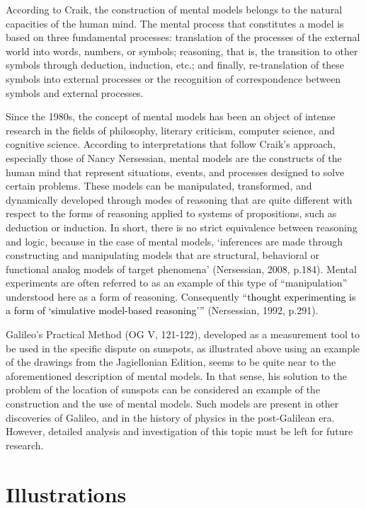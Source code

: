 \begin{artengenv}
According to Craik, the construction of mental models belongs to the natural capacities of the human mind. The mental
process that constitutes a model is based on three fundamental processes: translation of the processes of the external
world into words, numbers, or symbols; reasoning, that is, the transition to other symbols through deduction,
induction, etc.; and finally, re-translation of these symbols into external processes or the recognition of
correspondence between symbols and external processes.

Since the 1980s, the concept of mental models has been an object of intense research in the fields of philosophy,
literary criticism, computer science, and cognitive science. According to interpretations that follow Craik’s approach,
especially those of Nancy Nersessian, mental models are the constructs of the human mind that represent situations,
events, and processes designed to solve certain problems. These models can be manipulated, transformed, and dynamically
developed through modes of reasoning that are quite different with respect to the forms of reasoning applied to systems
of propositions, such as deduction or induction. In short, there is no strict equivalence between reasoning and logic,
because in the case of mental models, ‘inferences are made through constructing and manipulating models that are
structural, behavioral or functional analog models of target phenomena’ \label{ref:RNDTNzkt8wP4B}(Nersessian, 2008,
p.184). Mental experiments are often referred to as an example of this type of “manipulation” understood here as a form
of reasoning. Consequently “\textcolor{black}{thought experimenting is a form of ‘simulative model-based reasoning’”}
\label{ref:RNDuzOiOvTu5n}(Nersessian, 1992, p.291). 

Galileo’s Practical Method (OG V, 121-122), developed as a measurement tool to be used in the specific dispute on
sunspots, as illustrated above using an example of the drawings from the Jagiellonian Edition, seems to be quite near
to the aforementioned description of mental models. In that sense, his solution to the problem of the location of
sunspots can be considered an example of the construction and the use of mental models. Such models are present in
other discoveries of Galileo, and in the history of physics in the post-Galilean era. However, detailed analysis and
investigation of this topic must be left for future research. 

\section{Illustrations}


\end{artengenv}
